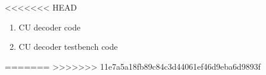 
\addchap{\appendixPhrase}
<<<<<<< HEAD
{\Large
	\begin{enumerate}[label=\Alph*.]
		\item CU decoder code 
		\item CU decoder testbench code
	\end{enumerate}
}
\pagebreak
=======
>>>>>>> 11e7a5a18fb89c84c3d44061ef46d9eba6d9893f
%
%

